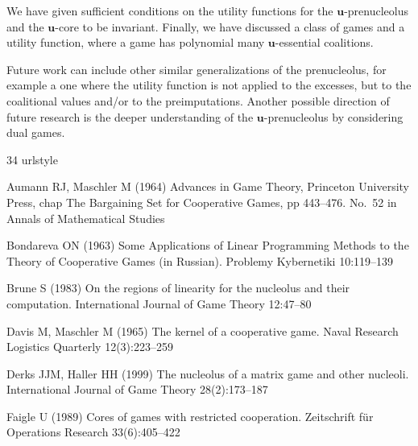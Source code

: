 \documentclass[a4paper,12pt]{article}
\theoremstyle{definition}
\theoremstyle{remark}
\begin{document}
We have given sufficient conditions on the utility functions for the $\mathbf{u}$-prenucleolus and the $\mathbf{u}$-core to be invariant. Finally, we have discussed a class of games and a utility function, where a game has polynomial many $\mathbf{u}$-essential coalitions.

Future work can include other similar generalizations of the prenucleolus, for example a one where the utility function is not applied to the excesses, but to the coalitional values and/or to the preimputations. Another possible direction of future research is the deeper understanding of the $\mathbf{u}$-prenucleolus by considering dual games.

%
%

\begin{thebibliography}{34}
\providecommand{\natexlab}[1]{#1}
\providecommand{\url}[1]{{#1}}
\providecommand{\urlprefix}{URL }
\expandafter\ifx\csname urlstyle\endcsname\relax
  \providecommand{\doi}[1]{DOI~\discretionary{}{}{}#1}\else
  \providecommand{\doi}{DOI~\discretionary{}{}{}\begingroup
  \urlstyle{rm}\Url}\fi
\providecommand{\eprint}[2][]{\url{#2}}

Aumann RJ, Maschler M (1964) Advances in Game Theory, Princeton University
  Press, chap The Bargaining Set for Cooperative Games, pp 443--476. No.~52 in
  Annals of Mathematical Studies

Bondareva ON (1963) {Some Applications of Linear Programming Methods to the
  Theory of Cooperative Games (in {R}ussian)}. Problemy Kybernetiki 10:119--139

Brune S (1983) On the regions of linearity for the nucleolus and their
  computation. International Journal of Game Theory 12:47--80

Davis M, Maschler M (1965) {The kernel of a cooperative game}. Naval Research
  Logistics Quarterly 12(3):223--259

Derks JJM, Haller HH (1999) The nucleolus of a matrix game and other nucleoli.
  International Journal of Game Theory 28(2):173--187

Faigle U (1989) {Cores of games with restricted cooperation}. Zeitschrift
  f{\"u}r Operations Research 33(6):405--422


\end{thebibliography}
\end{document}

